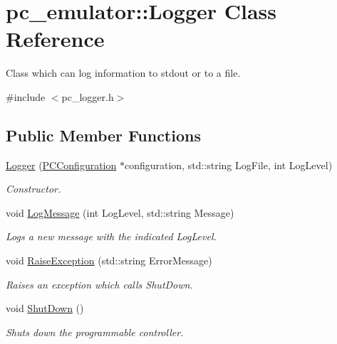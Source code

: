 \hypertarget{classpc__emulator_1_1Logger}{}\section{pc\+\_\+emulator\+:\+:Logger Class Reference}
\label{classpc__emulator_1_1Logger}


Class which can log information to stdout or to a file.  




{\ttfamily \#include $<$pc\+\_\+logger.\+h$>$}

\subsection*{Public Member Functions}
\begin{DoxyCompactItemize}
\item 
\hyperlink{classpc__emulator_1_1Logger_a26b4bcb02142f7e206c5f537b8d6367e}{Logger} (\hyperlink{classpc__emulator_1_1PCConfiguration}{P\+C\+Configuration} $\ast$configuration, std\+::string Log\+File, int Log\+Level)
\begin{DoxyCompactList}\small\item\em Constructor. \end{DoxyCompactList}\item 
void \hyperlink{classpc__emulator_1_1Logger_a30264e4e496bf8a2e74f56d57dc92067}{Log\+Message} (int Log\+Level, std\+::string Message)\hypertarget{classpc__emulator_1_1Logger_a30264e4e496bf8a2e74f56d57dc92067}{}\label{classpc__emulator_1_1Logger_a30264e4e496bf8a2e74f56d57dc92067}

\begin{DoxyCompactList}\small\item\em Logs a new message with the indicated Log\+Level. \end{DoxyCompactList}\item 
void \hyperlink{classpc__emulator_1_1Logger_a6a3838f5cdc03f802decfde8c06a3c9e}{Raise\+Exception} (std\+::string Error\+Message)\hypertarget{classpc__emulator_1_1Logger_a6a3838f5cdc03f802decfde8c06a3c9e}{}\label{classpc__emulator_1_1Logger_a6a3838f5cdc03f802decfde8c06a3c9e}

\begin{DoxyCompactList}\small\item\em Raises an exception which calls Shut\+Down. \end{DoxyCompactList}\item 
void \hyperlink{classpc__emulator_1_1Logger_a8df868de90c2149fefacbbbe0ff91539}{Shut\+Down} ()\hypertarget{classpc__emulator_1_1Logger_a8df868de90c2149fefacbbbe0ff91539}{}\label{classpc__emulator_1_1Logger_a8df868de90c2149fefacbbbe0ff91539}

\begin{DoxyCompactList}\small\item\em Shuts down the programmable controller. \end{DoxyCompactList}\end{DoxyCompactItemize}


